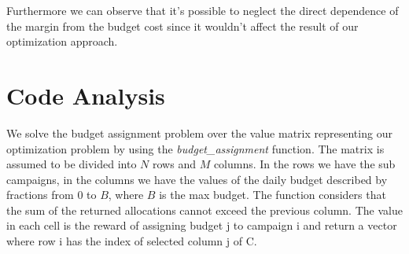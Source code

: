 Furthermore we can observe that it's possible to neglect the direct dependence of the margin from the budget cost since it wouldn't affect the result of our optimization approach.

\section{Code Analysis}
\label{sec:Opt_Code Analysis}

We solve the budget assignment problem over the value matrix representing our optimization problem by using the \textit{budget\_assignment} function. The matrix is assumed to be divided into $N$ rows and $M$ columns. In the rows we have the sub campaigns, in the columns we have the values of the daily budget described by fractions from 0 to $B$, where $B$ is the max budget. The function considers that the sum of the returned allocations cannot exceed the previous column. The value in each cell is the reward of assigning budget j to campaign i and return a vector where row i has the index of selected column j of C.

